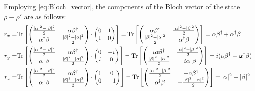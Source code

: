 Employing \autoref{eq:Bloch_vector}, the components of the Bloch vector of the state $\rho-\rho'$ are as follows:
\begin{equation} {\label{eq:bloch_vector_T}}
  \begin{split}
    r_{x} = &  \text{Tr} \left[ \begin{pmatrix}
      \frac{|\alpha|^{2} - |\beta|^{2} } {2} & \alpha \beta^{\dag}\\
      \alpha^{\dag} \beta & \frac{ |\beta|^{2} - |\alpha|^{2} } {2} 
  \end{pmatrix} \cdot \begin{pmatrix}
  0&1\\
  1&0
  \end{pmatrix} \right]  =  \text{Tr} \left[ \begin{pmatrix}
    \alpha \beta^{\dag} & \frac{|\alpha|^{2} - |\beta|^{2} } {2} \\
    \frac{|\beta|^{2} - |\alpha|^{2} } {2} & \alpha^{\dag} \beta
\end{pmatrix} \right] = \alpha \beta^{\dag} + \alpha^{\dag} \beta \\
r_{y} = &  \text{Tr} \left[ \begin{pmatrix}
  \frac{|\alpha|^{2} - |\beta|^{2} } {2} & \alpha \beta^{\dag}\\
  \alpha^{\dag} \beta & \frac{ |\beta|^{2} - |\alpha|^{2} } {2}
\end{pmatrix} \cdot \begin{pmatrix}
0&-i\\
i&0
\end{pmatrix} \right]  =  \text{Tr} \left[ \begin{pmatrix}
  i \alpha \beta^{\dag} & \frac{|\alpha|^{2} - |\beta|^{2} } {2} \\
  \frac{|\beta|^{2} - |\alpha|^{2} } {2} & -i\alpha^{\dag} \beta
\end{pmatrix} \right] = i(\alpha \beta^{\dag} - \alpha^{\dag} \beta) \\
r_{z} = &  \text{Tr} \left[ \begin{pmatrix}
  \frac{|\alpha|^{2} - |\beta|^{2} } {2} & \alpha \beta^{\dag}\\
  \alpha^{\dag} \beta & \frac{ |\beta|^{2} - |\alpha|^{2} } {2}
\end{pmatrix} \cdot \begin{pmatrix}
1&0\\
0&-1
\end{pmatrix} \right]  =  \text{Tr} \left[ \begin{pmatrix}
  \frac{|\alpha|^{2} - |\beta|^{2} } {2} & -\alpha \beta^{\dag}\\
  \alpha^{\dag} \beta & -\frac{ |\beta|^{2} - |\alpha|^{2} } {2}
\end{pmatrix} \right] = |\alpha|^{2} - |\beta|^{2}
  \end{split}
  \end{equation}

